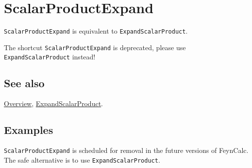 \documentclass[../FeynCalcManual.tex]{subfiles}
\begin{document}
\hypertarget{scalarproductexpand}{
\section{ScalarProductExpand}\label{scalarproductexpand}}

\texttt{ScalarProductExpand} is equivalent to
\texttt{ExpandScalarProduct}.

The shortcut \texttt{ScalarProductExpand} is deprecated, please use
\texttt{ExpandScalarProduct} instead!

\subsection{See also}

\hyperlink{toc}{Overview},
\hyperlink{expandscalarproduct}{ExpandScalarProduct}.

\subsection{Examples}

\texttt{ScalarProductExpand} is scheduled for removal in the future
versions of FeynCalc. The safe alternative is to use
\texttt{ExpandScalarProduct}.
\end{document}
